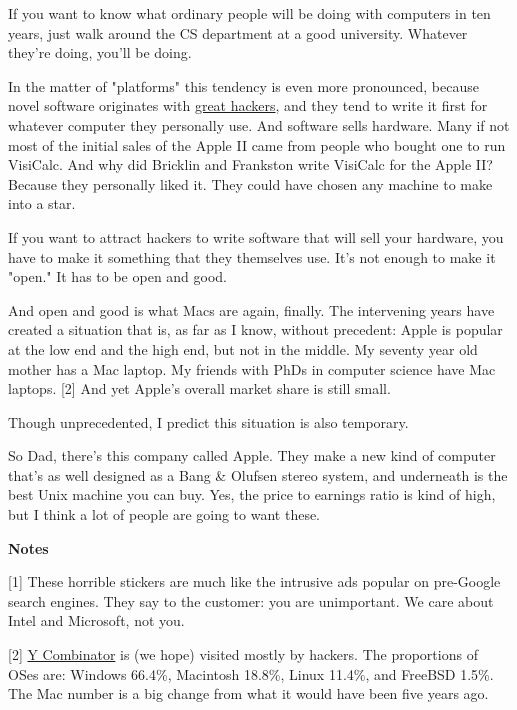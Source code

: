 If you want to know what ordinary
                  people will be doing with computers in ten years, just walk
                  around the CS department at a good university. Whatever
                  they're doing, you'll be doing.

In the matter of
                  "platforms" this tendency is even more pronounced, because
                  novel software originates with
                  \href{http://www.paulgraham.com/gh.html}{great hackers}, and they tend to write it
                  first for whatever computer they personally use. And software
                  sells hardware. Many if not most of the initial sales of the
                  Apple II came from people who bought one to run VisiCalc. And
                  why did Bricklin and Frankston write VisiCalc for the Apple
                  II? Because they personally liked it. They could have chosen
                  any machine to make into a star.

If you want to
                  attract hackers to write software that will sell your
                  hardware, you have to make it something that they themselves
                  use. It's not enough to make it "open." It has to be open and
                  good.

And open and good is what Macs are again,
                  finally. The intervening years have created a situation that
                  is, as far as I know, without precedent: Apple is popular at
                  the low end and the high end, but not in the middle. My
                  seventy year old mother has a Mac laptop. My friends with PhDs
                  in computer science have Mac laptops. [2] And yet Apple's
                  overall market share is still small.

Though
                  unprecedented, I predict this situation is also temporary.

So
                  Dad, there's this company called Apple. They make a new kind
                  of computer that's as well designed as a Bang \& Olufsen stereo
                  system, and underneath is the best Unix machine you can buy.
                  Yes, the price to earnings ratio is kind of high, but I think
                  a lot of people are going to want these.




                  \textbf{Notes}

[1] These horrible stickers are much
                  like the intrusive ads popular on pre-Google search engines.
                  They say to the customer: you are unimportant. We care about
                  Intel and Microsoft, not you.

[2]
                  \href{http://ycombinator.com}{Y Combinator} is (we hope)
                  visited mostly by hackers. The proportions of OSes are:
                  Windows 66.4\%, Macintosh 18.8\%, Linux 11.4\%, and FreeBSD 1.5\%.
                  The Mac number is a big change from what it would have been
                  five years ago.




              
            
          
